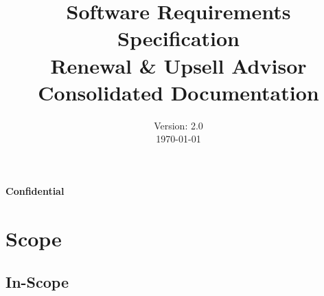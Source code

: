 \documentclass[12pt,a4paper]{article}
\title{\textbf{Software Requirements Specification}\\ \vspace{1cm} \Large Renewal \& Upsell Advisor\\ \vspace{0.5cm} \large Consolidated Documentation}
\author{}
\date{Version: 2.0\\ \today}
\begin{document}
\maketitle
\thispagestyle{empty}
\begin{center}
    \textbf{Confidential}
\end{center}

\newpage

\tableofcontents

\newpage

\section{Scope}

\subsection{In-Scope}
\end{document}
